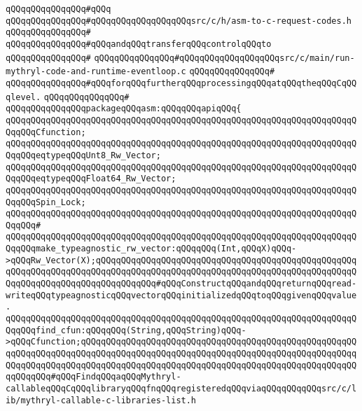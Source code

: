 \verb|qQQqqQQqqQQqqQQq#qQQq|\newline
\verb|qQQqqQQqqQQqqQQq#qQQqqQQqqQQqqQQqqQQqsrc/c/h/asm-to-c-request-codes.h|\newline
\verb|qQQqqQQqqQQqqQQq#|\newline
\verb|qQQqqQQqqQQqqQQq#qQQqandqQQqtransferqQQqcontrolqQQqto|\newline
\verb|qQQqqQQqqQQqqQQq#|\newline
\verb|qQQqqQQqqQQqqQQq#qQQqqQQqqQQqqQQqqQQqsrc/c/main/run-mythryl-code-and-runtime-eventloop.c|\newline
\verb|qQQqqQQqqQQqqQQq#|\newline
\verb|qQQqqQQqqQQqqQQq#qQQqforqQQqfurtherqQQqprocessingqQQqatqQQqtheqQQqCqQQqlevel.|\newline
\verb|qQQqqQQqqQQqqQQq#|\newline
\verb|qQQqqQQqqQQqqQQqpackageqQQqasm:qQQqqQQqapiqQQq{|\newline
\verb|qQQqqQQqqQQqqQQqqQQqqQQqqQQqqQQqqQQqqQQqqQQqqQQqqQQqqQQqqQQqqQQqqQQqqQQqqQQqCfunction;|\newline
\verb|qQQqqQQqqQQqqQQqqQQqqQQqqQQqqQQqqQQqqQQqqQQqqQQqqQQqqQQqqQQqqQQqqQQqqQQqqQQqeqtypeqQQqUnt8_Rw_Vector;|\newline
\verb|qQQqqQQqqQQqqQQqqQQqqQQqqQQqqQQqqQQqqQQqqQQqqQQqqQQqqQQqqQQqqQQqqQQqqQQqqQQqeqtypeqQQqFloat64_Rw_Vector;|\newline
\verb|qQQqqQQqqQQqqQQqqQQqqQQqqQQqqQQqqQQqqQQqqQQqqQQqqQQqqQQqqQQqqQQqqQQqqQQqqQQqSpin_Lock;|\newline
\verb|qQQqqQQqqQQqqQQqqQQqqQQqqQQqqQQqqQQqqQQqqQQqqQQqqQQqqQQqqQQqqQQqqQQqqQQqqQQq#|\newline
\verb|qQQqqQQqqQQqqQQqqQQqqQQqqQQqqQQqqQQqqQQqqQQqqQQqqQQqqQQqqQQqqQQqqQQqqQQqqQQqmake_typeagnostic_rw_vector:qQQqqQQq(Int,qQQqX)qQQq->qQQqRw_Vector(X);qQQqqQQqqQQqqQQqqQQqqQQqqQQqqQQqqQQqqQQqqQQqqQQqqQQqqQQqqQQqqQQqqQQqqQQqqQQqqQQqqQQqqQQqqQQqqQQqqQQqqQQqqQQqqQQqqQQqqQQqqQQqqQQqqQQqqQQqqQQqqQQqqQQqqQQq#qQQqConstructqQQqandqQQqreturnqQQqread-writeqQQqtypeagnosticqQQqvectorqQQqinitializedqQQqtoqQQqgivenqQQqvalue.|\newline
\verb|qQQqqQQqqQQqqQQqqQQqqQQqqQQqqQQqqQQqqQQqqQQqqQQqqQQqqQQqqQQqqQQqqQQqqQQqqQQqfind_cfun:qQQqqQQq(String,qQQqString)qQQq->qQQqCfunction;qQQqqQQqqQQqqQQqqQQqqQQqqQQqqQQqqQQqqQQqqQQqqQQqqQQqqQQqqQQqqQQqqQQqqQQqqQQqqQQqqQQqqQQqqQQqqQQqqQQqqQQqqQQqqQQqqQQqqQQqqQQqqQQqqQQqqQQqqQQqqQQqqQQqqQQqqQQqqQQqqQQqqQQqqQQqqQQqqQQqqQQqqQQqqQQqqQQqqQQqqQQq#qQQqFindqQQqaqQQqMythryl-callableqQQqCqQQqlibraryqQQqfnqQQqregisteredqQQqviaqQQqqQQqqQQqsrc/c/lib/mythryl-callable-c-libraries-list.h|\newline
